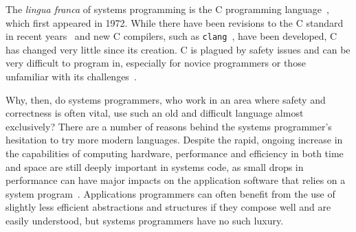 The \textit{lingua franca} of systems programming is the C programming language~\cite{kernighan1988c}, which first appeared in 1972. While there have been revisions to the C standard in recent years~\cite{C11,C99} and new C compilers, such as \texttt{clang}~\cite{lattner2008llvm}, have been developed, C has changed very little since its creation. C is plagued by safety issues and can be very difficult to program in, especially for novice programmers or those unfamiliar with its challenges~\cite{Shapiro:2006:PLC:1215995.1216004,Ray:2014:LSS:2635868.2635922,Bhattacharya:2011:APL:1985793.1985817}.

Why, then, do systems programmers, who work in an area where safety and correctness is often vital, use such an old and difficult language almost exclusively? There are a number of reasons behind the systems programmer's hesitation to try more modern languages. Despite the rapid, ongoing increase in the capabilities of computing hardware, performance and efficiency in both time and space are still deeply important in systems code, as small drops in performance can have major impacts on the application software that relies on a system program~\cite{Shapiro:2006:PLC:1215995.1216004}. Applications programmers can often benefit from the use of slightly less efficient abstractions and structures if they compose well and are easily understood, but systems programmers have no such luxury.


